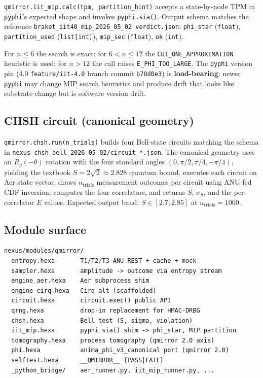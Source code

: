 \texttt{qmirror.iit\_mip.calc(tpm, partition\_hint)} accepts a
state-by-node TPM in \texttt{pyphi}'s expected shape and invokes
\texttt{pyphi.sia()}. Output schema matches the reference
\texttt{braket\_iit40\_mip\_2026\_05\_02 verdict.json}:
\texttt{phi\_star} (\texttt{float}), \texttt{partition\_used}
(\texttt{list[int]}), \texttt{mip\_sec} (\texttt{float}), \texttt{ok}
(\texttt{int}).

For $n \le 6$ the search is exact; for $6 < n \le 12$ the
\texttt{CUT\_ONE\_APPROXIMATION} heuristic is used; for $n > 12$ the
call raises \texttt{E\_PHI\_TOO\_LARGE}. The \texttt{pyphi} version
pin (4.0 \texttt{feature/iit-4.0} branch commit \texttt{b78d0e3}) is
\textbf{load-bearing}: newer \texttt{pyphi} may change MIP search
heuristics and produce drift that looks like substrate change but is
software version drift.

\subsection{CHSH circuit (canonical geometry)}

\texttt{qmirror.chsh.run(n\_trials)} builds four Bell-state circuits
matching the schema in
\texttt{nexus\_chsh\_bell\_2026\_05\_02/circuit\_*.json}. The canonical
geometry uses an $R_{y}(-\theta)$ rotation with the four standard
angles $(0, \pi/2, \pi/4, -\pi/4)$, yielding the textbook
$S = 2\sqrt{2} \approx 2.828$ quantum bound. \qmirror{} executes each
circuit on Aer state-vector, draws $n_{\text{trials}}$ measurement
outcomes per circuit using ANU-fed CDF inversion, computes the four
correlators, and returns $S$, $\sigma_{S}$, and the per-correlator
$E$ values. Expected output band:
$S \in [2.7, 2.85]$ at $n_{\text{trials}} = 1000$.

\subsection{Module surface}

\begin{lstlisting}[caption={\qmirror{} module layout},label={lst:modules}]
nexus/modules/qmirror/
  entropy.hexa       T1/T2/T3 ANU REST + cache + mock
  sampler.hexa       amplitude -> outcome via entropy stream
  engine_aer.hexa    Aer subprocess shim
  engine_cirq.hexa   Cirq alt (scaffolded)
  circuit.hexa       circuit.exec() public API
  qrng.hexa          drop-in replacement for HMAC-DRBG
  chsh.hexa          Bell test (S, sigma, violation)
  iit_mip.hexa       pyphi sia() shim -> phi_star, MIP partition
  tomography.hexa    process tomography (qmirror 2.0 axis)
  phi.hexa           anima_phi_v3_canonical port (qmirror 2.0)
  selftest.hexa      __QMIRROR__ {PASS|FAIL}
  _python_bridge/    aer_runner.py, iit_mip_runner.py, ...
\end{lstlisting}
